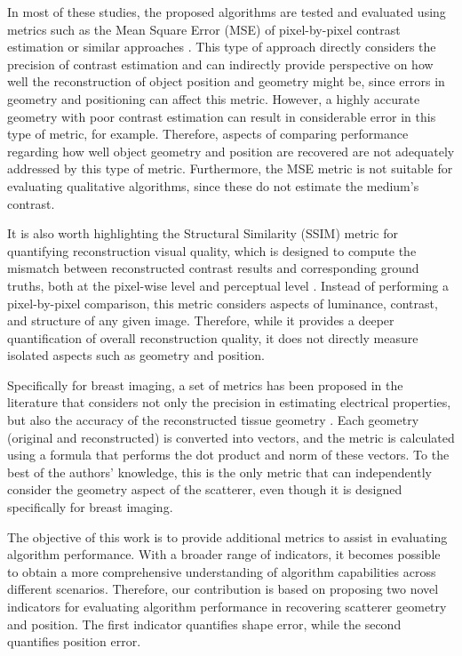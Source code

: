 \documentclass{IEEEtran}
\begin{document}
        In most of these studies, the proposed algorithms are tested and evaluated using metrics such as the Mean Square Error (MSE) of pixel-by-pixel contrast estimation or similar approaches \cite{yin2023subspace,zhang2023iterative,salucci2022learned,wang2023push,liu2022som,bevacqua2021simple,bevacqua2021effective}. This type of approach directly considers the precision of contrast estimation and can indirectly provide perspective on how well the reconstruction of object position and geometry might be, since errors in geometry and positioning can affect this metric. However, a highly accurate geometry with poor contrast estimation can result in considerable error in this type of metric, for example. Therefore, aspects of comparing performance regarding how well object geometry and position are recovered are not adequately addressed by this type of metric. Furthermore, the MSE metric is not suitable for evaluating qualitative algorithms, since these do not estimate the medium's contrast.

        It is also worth highlighting the Structural Similarity (SSIM) metric \cite{wang2004image} for quantifying reconstruction visual quality, which is designed to compute the mismatch between reconstructed contrast results and corresponding ground truths, both at the pixel-wise level and perceptual level \cite{wang2023push,liu2025exploring}. Instead of performing a pixel-by-pixel comparison, this metric considers aspects of luminance, contrast, and structure of any given image. Therefore, while it provides a deeper quantification of overall reconstruction quality, it does not directly measure isolated aspects such as geometry and position.

        Specifically for breast imaging, a set of metrics has been proposed in the literature that considers not only the precision in estimating electrical properties, but also the accuracy of the reconstructed tissue geometry \cite{kurrant2021evaluating}. Each geometry (original and reconstructed) is converted into vectors, and the metric is calculated using a formula that performs the dot product and norm of these vectors. To the best of the authors' knowledge, this is the only metric that can independently consider the geometry aspect of the scatterer, even though it is designed specifically for breast imaging.

        The objective of this work is to provide additional metrics to assist in evaluating algorithm performance. With a broader range of indicators, it becomes possible to obtain a more comprehensive understanding of algorithm capabilities across different scenarios. Therefore, our contribution is based on proposing two novel indicators for evaluating algorithm performance in recovering scatterer geometry and position. The first indicator quantifies shape error, while the second quantifies position error. 
\end{document}
